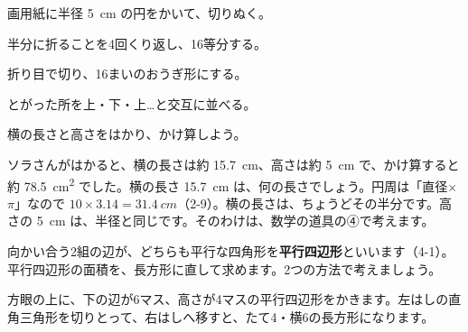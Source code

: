 \begin{yattemiyou}[円を16に切って並べかえよう]
\noindent\begin{minipage}[c]{0.74\linewidth}
\begin{enumerate}[label={\bkcircled[bkGreen]{\arabic*}}, leftmargin=2.4\zw, itemsep=0pt, topsep=0pt]
\item 画用紙に半径 \qty{5}{cm} の円をかいて、切りぬく。
\item 半分に折ることを4回くり返し、16等分する。
\item 折り目で切り、16まいのおうぎ形にする。
\item とがった所を上・下・上…と交互に並べる。
\item 横の長さと高さをはかり、かけ算しよう。
\end{enumerate}
\end{minipage}\hfill
\begin{minipage}[c]{0.24\linewidth}\centering
{}
\end{minipage}
\end{yattemiyou}

\noindent ソラさんがはかると、横の長さは約 \qty{15.7}{cm}、高さは約 \qty{5}{cm} で、かけ算すると約 \qty{78.5}{cm^2} でした。横の長さ \qty{15.7}{cm} は、何の長さでしょう。円周は「直径×$\pi$」なので $10\times3.14=\qty{31.4}{cm}$（2-9）。横の長さは、ちょうどその半分です。高さの \qty{5}{cm} は、半径と同じです。そのわけは、数学の道具の④で考えます。



\label{bk:4-5:heikou}向かい合う2組の辺が、どちらも平行な四角形を\textbf{平行四辺形}といいます（4-1）。平行四辺形の面積を、長方形に直して求めます。2つの方法で考えましょう。

方眼の上に、下の辺が6マス、高さが4マスの平行四辺形をかきます。左はしの直角三角形を切りとって、右はしへ移すと、たて4・横6の長方形になります。

